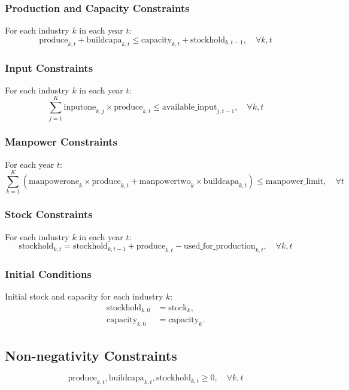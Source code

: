 \documentclass{article}
\begin{document}
\subsubsection*{Production and Capacity Constraints}
For each industry $k$ in each year $t$:
\[
\text{produce}_{k, t} + \text{buildcapa}_{k, t} \leq \text{capacity}_{k, t} + \text{stockhold}_{k, t-1}, \quad \forall k, t
\]

\subsubsection*{Input Constraints}
For each industry $k$ in each year $t$:
\[
\sum_{j=1}^K \text{inputone}_{k, j} \times \text{produce}_{k, t} \leq \text{available\_input}_{j, t-1}, \quad \forall k, t
\]

\subsubsection*{Manpower Constraints}
For each year $t$:
\[
\sum_{k=1}^K \left( \text{manpowerone}_{k} \times \text{produce}_{k, t} + \text{manpowertwo}_{k} \times \text{buildcapa}_{k, t} \right) \leq \text{manpower\_limit}, \quad \forall t
\]

\subsubsection*{Stock Constraints}
For each industry $k$ in each year $t$:
\[
\text{stockhold}_{k, t} = \text{stockhold}_{k, t-1} + \text{produce}_{k, t} - \text{used\_for\_production}_{k, t}, \quad \forall k, t
\]

\subsubsection*{Initial Conditions}
Initial stock and capacity for each industry $k$:
\begin{align*}
    \text{stockhold}_{k, 0} & = \text{stock}_{k}, \\
    \text{capacity}_{k, 0} & = \text{capacity}_{k}.
\end{align*}

\subsection*{Non-negativity Constraints}
\[
\text{produce}_{k, t}, \text{buildcapa}_{k, t}, \text{stockhold}_{k, t} \geq 0, \quad \forall k, t
\]
\end{document}
